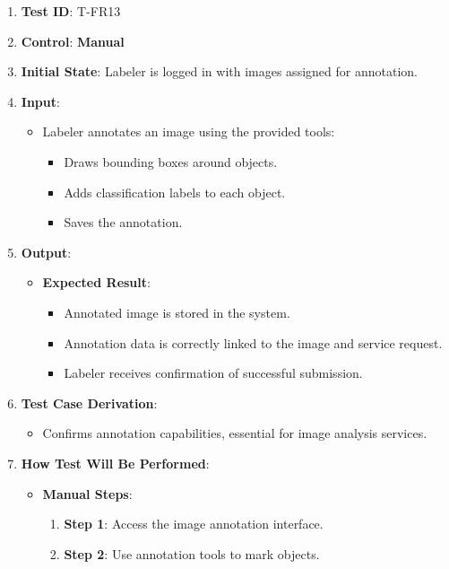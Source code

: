 \documentclass[12pt, titlepage]{article}
\begin{document}
\begin{enumerate}
    \item \textbf{Test ID}: T-FR13
    \item \textbf{Control}: \textbf{Manual}
    \item \textbf{Initial State}: Labeler is logged in with images assigned for annotation.
    \item \textbf{Input}:
    \begin{itemize}
        \item Labeler annotates an image using the provided tools:
        \begin{itemize}
            \item Draws bounding boxes around objects.
            \item Adds classification labels to each object.
            \item Saves the annotation.
        \end{itemize}
    \end{itemize}
    \item \textbf{Output}:
    \begin{itemize}
        \item \textbf{Expected Result}:
        \begin{itemize}
            \item Annotated image is stored in the system.
            \item Annotation data is correctly linked to the image and service request.
            \item Labeler receives confirmation of successful submission.
        \end{itemize}
    \end{itemize}
    \item \textbf{Test Case Derivation}:
    \begin{itemize}
        \item Confirms annotation capabilities, essential for image analysis services.
    \end{itemize}
    \item \textbf{How Test Will Be Performed}:
    \begin{itemize}
        \item \textbf{Manual Steps}:
        \begin{enumerate}
            \item \textbf{Step 1}: Access the image annotation interface.
            \item \textbf{Step 2}: Use annotation tools to mark objects.

\end{enumerate}
\end{itemize}
\end{enumerate}
\end{document}
